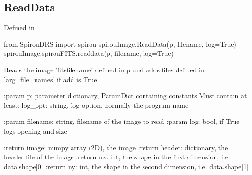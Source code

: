 
\begin{minipage}{\textwidth}
\subsection{ReadData}

Defined in \spirouImage{}

\begin{pythonbox}
from SpirouDRS import spirou
spirouImage.ReadData(p, filename, log=True)
spirouImage.spirouFITS.readdata(p, filename, log=True)
\end{pythonbox}

\begin{pythondocstring}
Reads the image 'fitsfilename' defined in p and adds files defined in
'arg_file_names' if add is True

:param p: parameter dictionary, ParamDict containing constants
    Must contain at least:
            log_opt: string, log option, normally the program name

:param filename: string, filename of the image to read
:param log: bool, if True logs opening and size

:return image: numpy array (2D), the image
:return header: dictionary, the header file of the image
:return nx: int, the shape in the first dimension, i.e. data.shape[0]
:return ny: int, the shape in the second dimension, i.e. data.shape[1]
\end{pythondocstring}
\end{minipage}


